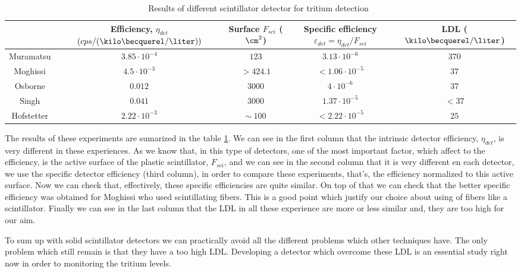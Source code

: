 \begin{table}[htbp]
\begin{center}
\begin{tabular}{|c|c|c|c|c|}
\hline
 & \parbox{6em}{\centering Efficiency, $\eta_{det}$\\ $(cps/(\kilo\becquerel/\liter))$}  & \parbox{5em}{\centering Surface\\ $F_{sci}$ ($\cm^2$)}  & \parbox{5em}{\centering Specific efficiency\\ $\varepsilon_{det}=\eta_{det}/F_{sci}$} & LDL ($\kilo\becquerel/\liter$)\\
\hline \hline \hline
Muramatsu & $3.85 \cdot 10^{-4}$ & $123$ & $3.13 \cdot 10^{-6}$ & $370$ \\ \hline
Moghissi & $4.5 \cdot 10^{-3}$ & $>424.1$ & $<1.06 \cdot 10^{-5}$ & $37$ \\ \hline
Osborne & $0.012$ & $3000$ & $4 \cdot 10^{-6}$ & $37$ \\ \hline
Singh & $0.041$ & $3000$ & $1.37 \cdot 10^{-5}$ & $<37$ \\ \hline
Hofstetter & $2.22 \cdot 10^{-3}$ & $\sim~100$ & $<2.22 \cdot 10^{-5}$ & $25$ \\ \hline
\end{tabular}
\caption{Results of different scintillator detector for tritium detection~\cite{TesisTritio}}
\label{PlasticScinTritium}
\end{center}
\end{table}


The results of these experiments are sumarized in the table \ref{PlasticScinTritium}. We can see in the first column that the intrinsic detector efficiency, $\eta_{det}$, is very different in these experiences. As we know that, in this type of detectors, one of the most important factor, which affect to the efficiency, is the active surface of the plastic scintillator, $F_{sci}$, and we can see in the second column that it is very different en each detector, we use the specific detector efficiency (third column), in order to compare these experiments, that's, the efficiency normalized to this active surface. Now we can check that, effectively, these specific efficiencies are quite similar. On top of that we can check that the better specific efficiency was obtained for Moghissi who used scintillating fibers. This is a good point which justify our choice about using of fibers like a scintillator. Finally we can see in the last column that the LDL in all these experience are more or less similar and, they are too high for our aim. 

To sum up with solid scintillator detectors we can practically avoid all the different problems which other techniques have. The only problem which still remain is that they have a too high LDL. Developing a detector which overcome these LDL is an essential study right now in order to monitoring the tritium levels.